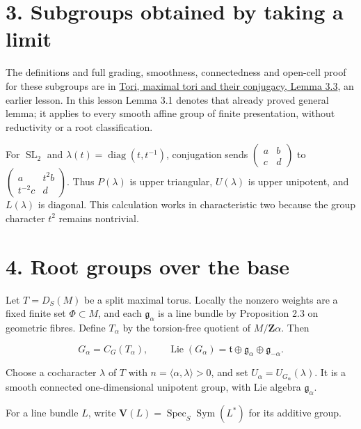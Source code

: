 \documentclass[11pt,a4paper,openany]{report}
\begin{document}
\section{3. Subgroups obtained by taking a limit}\label{AG-RG-03-subgroups-obtained-by-taking-a-limit}

The definitions and full grading, smoothness, connectedness and open-cell proof for these subgroups are in \href{https://github.com/KokunoYumeto/open-math-courses/blob/main/docs/courses/AG-RG/AG-RG-01.md\#subgroups-obtained-by-taking-a-limit}{Tori, maximal tori and their conjugacy, Lemma 3.3}, an earlier lesson. In this lesson Lemma 3.1 denotes that already proved general lemma; it applies to every smooth affine group of finite presentation, without reductivity or a root classification.

For \(\operatorname{SL}_2\) and \(\lambda(t)=\operatorname{diag}(t,t^{-1})\), conjugation sends \(\begin{pmatrix}a&b\\c&d\end{pmatrix}\) to \(\begin{pmatrix}a&t^2b\\t^{-2}c&d\end{pmatrix}\). Thus \(P(\lambda)\) is upper triangular, \(U(\lambda)\) is upper unipotent, and \(L(\lambda)\) is diagonal. This calculation works in characteristic two because the group character \(t^2\) remains nontrivial.

\section{4. Root groups over the base}\label{AG-RG-03-root-groups-over-the-base}

Let \(T=D_S(M)\) be a split maximal torus. Locally the nonzero weights are a fixed finite set \(\Phi\subset M\), and each \(\mathfrak g_\alpha\) is a line bundle by Proposition 2.3 on geometric fibres. Define \(T_\alpha\) by the torsion-free quotient of \(M/\mathbf Z\alpha\). Then

\[
G_\alpha=C_G(T_\alpha),\qquad
\operatorname{Lie}(G_\alpha)=\mathfrak t\oplus\mathfrak g_\alpha\oplus\mathfrak g_{-\alpha}.
\]

Choose a cocharacter \(\lambda\) of \(T\) with \(n=\langle\alpha,\lambda\rangle>0\), and set \(U_\alpha=U_{G_\alpha}(\lambda)\). It is a smooth connected one-dimensional unipotent group, with Lie algebra \(\mathfrak g_\alpha\).

For a line bundle \(L\), write \(\mathbf V(L)=\operatorname{Spec}_S\operatorname{Sym}(L^*)\) for its additive group.
\end{document}
